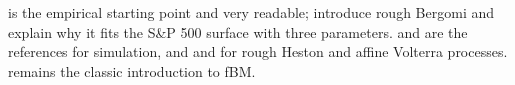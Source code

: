 \furtherreading
\textcite{gatheral-jaisson-rosenbaum-2018} is the empirical starting point and very readable;
\textcite{bayer-friz-gatheral-2016} introduce rough Bergomi and explain why it fits the S\&P 500 surface with three
parameters. \textcite{bennedsen-lunde-pakkanen-2017} and \textcite{mccrickerd-pakkanen-2018} are the references for
simulation, and \textcite{el-euch-rosenbaum-2019} and \textcite{abi-jaber-larsson-pulido-2019} for rough Heston and
affine Volterra processes. \textcite{mandelbrot-van-ness-1968} remains the classic introduction to fBM.
